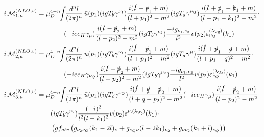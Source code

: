\begin{align}
i\Md^{(NLO,v)}_{1,\mu} &=\mu_D^{4-n}\!\!\int\!\!\frac{d^nl}{(2\pi)^n}\,\bar u(p_1)(igT_b\gamma^{\nu_1})\frac{i(\slashed{l}+\slashed{p}_1+m)}{(l+p_1)^2-m^2}(igT_a\gamma^{\nu_Q})\frac{i(\slashed{l}+\slashed{p}_1-\slashed{k}_1+m)}{(l+p_1-k_1)^2-m^2}\cdot\nonumber\\
 &\hspace{40pt}(-i e e_H \gamma_\mu)\frac{i(\slashed{l}-\slashed{p}_2+m)}{(l-p_2)^2-m^2}(igT_b\gamma^{\nu_2})\frac{-ig_{\nu_1,\nu_2}}{l^2}v(p_2)\varepsilon^{(\lambda_{\Pg})}_{\nu_Q}(k_1)\\
i\Md^{(NLO,v)}_{2,\mu} &= \mu_D^{4-n}\!\!\int\!\!\frac{d^nl}{(2\pi)^n}\,\bar u(p_1)(igT_b\gamma^{\nu_1})\frac{i(\slashed{l}+\slashed{p}_1+m)}{(l+p_1)^2-m^2}(igT_a\gamma^{\mu})\frac{i(\slashed{l}+\slashed{p}_1-\slashed{q}+m)}{(l+p_1-q)^2-m^2}\cdot\nonumber\\
 &\hspace{40pt}(-i e e_H \gamma_{\nu_Q})\frac{i(\slashed{l}-\slashed{p}_2+m)}{(l-p_2)^2-m^2}(igT_b\gamma^{\nu_2})\frac{-ig_{\nu_1,\nu_2}}{l^2}v(p_2)\varepsilon^{(\lambda_{\Pg})}_{\nu_Q}(k_1)\\
i\Md^{(NLO,v)}_{3,\mu} &=\mu_D^{4-n}\!\!\int\!\!\frac{d^nl}{(2\pi)^n}\,\bar u(p_1)(igT_c\gamma^{\nu_Q})\frac{i(\slashed{l}+\slashed{q}-\slashed{p}_2+m)}{(l+q-p_2)^2-m^2}(-i e e_H \gamma_\mu)\frac{i(\slashed{l}-\slashed{p}_2+m)}{(l-p_2)^2-m^2}\cdot\nonumber\\
 &\hspace{20pt}(igT_b\gamma^{\nu_2})\frac{(-i)^2}{l^2(l-k_1)^2}v(p_2)\varepsilon^{\nu,(\lambda_{\Pg})}(k_1)\cdot\nonumber\\
 &\hspace{20pt}\left(gf_{abc}\left(g_{\nu_2\nu_Q}(k_1-2l)_\nu+g_{\nu_Q\nu}(l-2k_1)_{\nu_2}+g_{\nu\nu_2}(k_1+l)_{\nu_Q}\right)\right)
\end{align}

\pagebreak

